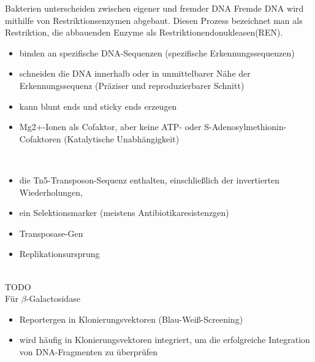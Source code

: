 Bakterien unterscheiden zwischen eigener und fremder DNA
Fremde DNA wird mithilfe von Restriktionsenzymen abgebaut.
Diesen Prozess bezeichnet man als Restriktion, die abbauenden Enzyme als Restriktionendonukleasen(REN). \\ \newline

\begin{itemize}
    \item binden an spezifische DNA-Sequenzen (spezifische Erkennungssequenzen)
    \item schneiden die DNA innerhalb oder in unmittelbarer Nähe der Erkennungssequenz (Präziser und reproduzierbarer Schnitt)
    \item kann \gls{blunt ends} und \gls{sticky ends} erzeugen 
    \item Mg2+-Ionen als Cofaktor, aber keine ATP- oder S-Adenosylmethionin-Cofaktoren (Katalytische Unabhängigkeit)
\end{itemize} $\ $ \\

\begin{itemize}
    \item  die Tn5-Transposon-Sequenz enthalten, einschließlich der invertierten Wiederholungen,
    \item ein Selektionsmarker (meistens Antibiotikaresistenzgen)
    \item Transposase-Gen
    \item Replikationsursprung
\end{itemize} $\ $ \\


TODO $\ $ \\


Für $\beta$-Galactosidase \\ \newline

\begin{itemize}
    \item Reportergen in Klonierungsvektoren (Blau-Weiß-Screening)
    \item wird häufig in Klonierungsvektoren integriert, um die erfolgreiche Integration von DNA-Fragmenten zu überprüfen
\end{itemize} $\ $ \\

